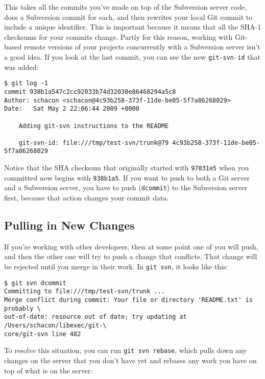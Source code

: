 \documentclass[a4paper]{book}
\begin{document}
This takes all the commits you've made on top of the Subversion server code, does a Subversion commit for each, and then rewrites your local Git commit to include a unique identifier. This is important because it means that all the SHA-1 checksums for your commits change. Partly for this reason, working with Git-based remote versions of your projects concurrently with a Subversion server isn't a good idea. If you look at the last commit, you can see the new \texttt{git-svn-id} that was added:

\begin{shaded}\begin{verbatim}
$ git log -1
commit 938b1a547c2cc92033b74d32030e86468294a5c8
Author: schacon <schacon@4c93b258-373f-11de-be05-5f7a86268029>
Date:   Sat May 2 22:06:44 2009 +0000

    Adding git-svn instructions to the README

    git-svn-id: file:///tmp/test-svn/trunk@79 4c93b258-373f-11de-be05-5f7a86268029
\end{verbatim}\end{shaded}

Notice that the SHA checksum that originally started with \texttt{97031e5} when you committed now begins with \texttt{938b1a5}. If you want to push to both a Git server and a Subversion server, you have to push (\texttt{dcommit}) to the Subversion server first, because that action changes your commit data.

\subsection{Pulling in New Changes}

If you're working with other developers, then at some point one of you will push, and then the other one will try to push a change that conflicts. That change will be rejected until you merge in their work. In \texttt{git svn}, it looks like this:

\begin{shaded}\begin{verbatim}
$ git svn dcommit
Committing to file:///tmp/test-svn/trunk ...
Merge conflict during commit: Your file or directory 'README.txt' is probably \
out-of-date: resource out of date; try updating at /Users/schacon/libexec/git-\
core/git-svn line 482
\end{verbatim}\end{shaded}

To resolve this situation, you can run \texttt{git svn rebase}, which pulls down any changes on the server that you don't have yet and rebases any work you have on top of what is on the server:
\end{document}
